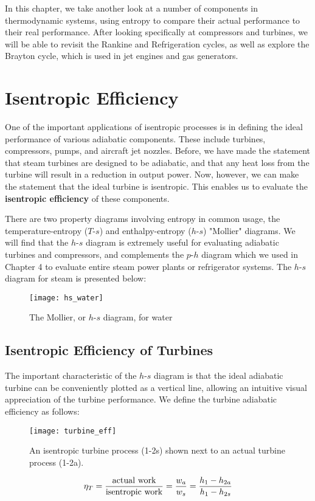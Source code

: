 In this chapter, we take another look at a number of components in thermodynamic systems, using entropy to compare their actual performance to their real performance.  After looking specifically at compressors and turbines, we will be able to revisit the Rankine and Refrigeration cycles, as well as explore the Brayton cycle, which is used in jet engines and gas generators.

\section{Isentropic Efficiency}
One of the important applications of isentropic processes is in defining the ideal performance of various adiabatic components. These include turbines, compressors, pumps, and aircraft jet nozzles. Before, we have made the statement that steam turbines are designed to be adiabatic, and that any heat loss from the turbine will result in a reduction in output power. Now, however, we can make the statement that the ideal turbine is isentropic. This enables us to evaluate the {\bf isentropic efficiency} of these components.

There are two property diagrams involving entropy in common usage, the temperature-entropy ($T$-$s$) and enthalpy-entropy ($h$-$s$) "Mollier" diagrams. We will find that the $h$-$s$ diagram is extremely useful for evaluating adiabatic turbines and compressors, and complements the $p$-$h$ diagram which we used in Chapter 4 to evaluate entire steam power plants or refrigerator systems. The $h$-$s$ diagram for steam is presented below:
\nopagebreak[4]%
\begin{figure}[H]
  \centering
  \texttt{[image: hs\_water]}
  \caption{The Mollier, or $h$-$s$ diagram, for water}
  \label{fig:hs_water}
\end{figure}
\subsection{Isentropic Efficiency of Turbines}
The important characteristic of the $h$-$s$ diagram is that the ideal adiabatic turbine can be conveniently plotted as a vertical line, allowing an intuitive visual appreciation of the turbine performance. We define the turbine adiabatic efficiency as follows:
\nopagebreak[4]%
\begin{figure}[H]
  \centering
  \texttt{[image: turbine\_eff]}
  \caption{An isentropic turbine process (1-2s) shown next to an actual turbine process (1-2a).}
  \label{fig:turbine_eff}
\end{figure}
\begin{equation} \label{eq:turbine_eff}
  \eta_T = \frac{\rm actual\ work}{\rm isentropic\ work} = \frac{w_a}{w_s} = \frac{h_1 - h_{2a}}{h_1 - h_{2s}}
\end{equation}

